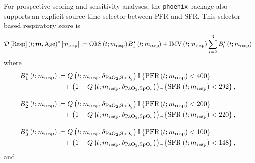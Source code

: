 \documentclass[letterpaper,10pt]{article}
\begin{document}
For prospective scoring and sensitivity analyses, the \texttt{phoenix} package
also supports an explicit source-time selector between PFR and SFR.  This
selector-based respiratory score is
\begin{equation}
  \label{eq:resp-selector}
  \DS{Resp}^{\star}[\m{resp}] \coloneqq
    \ORS B_1^{\star}\left(t; \m{resp}\right)
    +
    \IMV \sum_{i=2}^{3} B_i^{\star}\left(t; \m{resp}\right)
\end{equation}
where
\begin{equation}
  \label{eq:resp-conditions-selector}
  \begin{aligned}
    B_1^{\star}\left(t; m_{\mathrm{resp}}\right) &\coloneqq Q\left(t; m_{\mathrm{resp}}, \delta_{\mathrm{PaO}_{2},\mathrm{SpO}_{2}}\right) \mathbb{I}\left\{\mathrm{PFR}\left(t; m_{\mathrm{resp}}\right) < 400 \right\} \\
                                &\phantom{\coloneqq}+ \left(1 - Q\left(t; m_{\mathrm{resp}}, \delta_{\mathrm{PaO}_{2},\mathrm{SpO}_{2}}\right) \right) \mathbb{I}\left\{\mathrm{SFR}\left(t; m_{\mathrm{resp}}\right) < 292\right\}, \\[2ex]
    B_2^{\star}\left(t; m_{\mathrm{resp}}\right) &\coloneqq Q\left(t; m_{\mathrm{resp}}, \delta_{\mathrm{PaO}_{2},\mathrm{SpO}_{2}}\right) \mathbb{I}\left\{\mathrm{PFR}\left(t; m_{\mathrm{resp}}\right) < 200 \right\} \\
                                &\phantom{\coloneqq}+ \left(1 - Q\left(t; m_{\mathrm{resp}}, \delta_{\mathrm{PaO}_{2},\mathrm{SpO}_{2}}\right) \right) \mathbb{I}\left\{\mathrm{SFR}\left(t; m_{\mathrm{resp}}\right) < 220\right\}, \\[2ex]
    B_3^{\star}\left(t; m_{\mathrm{resp}}\right) &\coloneqq Q\left(t; m_{\mathrm{resp}}, \delta_{\mathrm{PaO}_{2},\mathrm{SpO}_{2}}\right) \mathbb{I}\left\{\mathrm{PFR}\left(t; m_{\mathrm{resp}}\right) < 100 \right\} \\
                                &\phantom{\coloneqq}+ \left(1 - Q\left(t; m_{\mathrm{resp}}, \delta_{\mathrm{PaO}_{2},\mathrm{SpO}_{2}}\right) \right) \mathbb{I}\left\{\mathrm{SFR}\left(t; m_{\mathrm{resp}}\right) < 148\right\},
  \end{aligned}
\end{equation}
and
\end{document}
